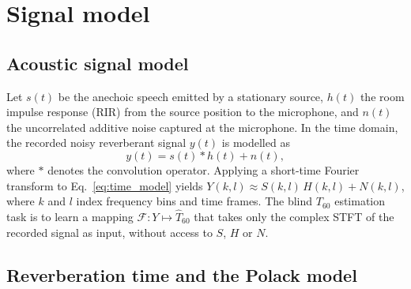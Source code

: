 \documentclass[a4paper,fleqn]{cas-sc}
\begin{document}
\section{Signal model}\label{sec:bg}

\subsection{Acoustic signal model}\label{sec:bg:signal}

Let $s(t)$ be the anechoic speech emitted by a stationary source,
$h(t)$ the room impulse response (RIR) from the source position to the
microphone, and $n(t)$ the uncorrelated additive noise captured at the
microphone. In the time domain, the recorded noisy reverberant signal
$y(t)$ is modelled as
\begin{equation}\label{eq:time_model}
  y(t) = s(t)\ast h(t) + n(t),
\end{equation}
where $\ast$ denotes the convolution operator. Applying a short-time
Fourier transform to Eq.~\eqref{eq:time_model} yields
$Y(k,l) \approx S(k,l)\,H(k,l) + N(k,l)$, where $k$ and $l$ index
frequency bins and time frames. The blind $T_{60}$ estimation task is to
learn a mapping $\mathcal{F}:Y \mapsto \hat{T}_{60}$ that takes only the
complex STFT of the recorded signal as input, without access to $S$,
$H$ or $N$.

\subsection{Reverberation time and the Polack model}\label{sec:bg:rt}
\end{document}
